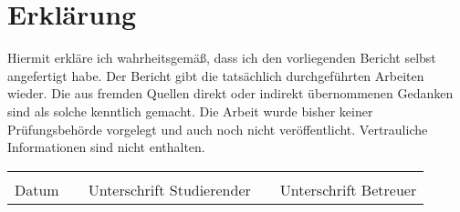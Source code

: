 \section*{Erklärung}
Hiermit erkläre ich wahrheitsgemäß, dass ich den vorliegenden Bericht selbst angefertigt habe. Der Bericht gibt die tatsächlich durchgeführten Arbeiten wieder. Die aus fremden Quellen direkt oder indirekt übernommenen Gedanken sind als solche kenntlich gemacht. Die Arbeit wurde bisher keiner Prüfungsbehörde vorgelegt und auch noch nicht veröffentlicht. Vertrauliche Informationen sind nicht enthalten.

\vspace{5cm}

\begin{table}[H]
\begin{tabular}{ccccc}
 & \hspace{2cm} &     & \hspace{2cm} & \\ \cline{1-1} \cline{3-3}  \cline{5-5}
\quad Datum \hphantom{..} & \hspace{1cm}& Unterschrift Studierender & \hspace{1cm} & Unterschrift Betreuer
\end{tabular}
\end{table}